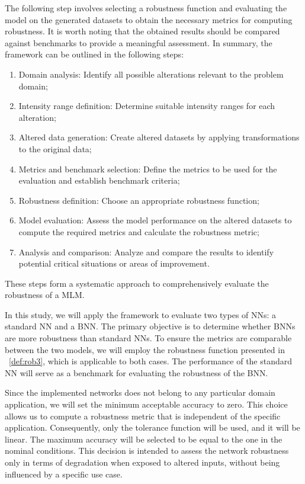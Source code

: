 The following step involves selecting a robustness function and evaluating the model on the generated datasets to obtain the necessary metrics for computing robustness. It is worth noting that the obtained results should be compared against benchmarks to provide a meaningful assessment.
In summary, the framework can be outlined in the following steps:
\begin{enumerate}
	\item Domain analysis: Identify all possible alterations relevant to the problem domain;
	\item Intensity range definition: Determine suitable intensity ranges for each alteration;
	\item Altered data generation: Create altered datasets by applying transformations to the original data;
	\item Metrics and benchmark selection: Define the metrics to be used for the evaluation and establish benchmark criteria;
	\item Robustness definition: Choose an appropriate robustness function;
	\item Model evaluation: Assess the model performance on the altered datasets to compute the required metrics and calculate the robustness metric;
	\item Analysis and comparison: Analyze and compare the results to identify potential critical situations or areas of improvement.
\end{enumerate}

These steps form a systematic approach to comprehensively evaluate the robustness of a MLM.

In this study, we will apply the framework to evaluate two types of NNs: a standard NN and a BNN. The primary objective is to determine whether BNNs are more robustness than standard NNs. To ensure the metrics are comparable between the two models, we will employ the robustness function presented in \Def~\ref{def:rob3}, which is applicable to both cases. The performance of the standard NN will serve as a benchmark for evaluating the robustness of the BNN.

Since the implemented networks does not belong to any particular domain application, we will set the minimum acceptable accuracy to zero. This choice allows us to compute a robustness metric that is independent of the specific application. Consequently, only the tolerance function will be used, and it will be linear. The maximum accuracy will be selected to be equal to the one in the nominal conditions. This decision is intended to assess the network robustness only in terms of degradation when exposed to altered inputs, without being influenced by a specific use case.

